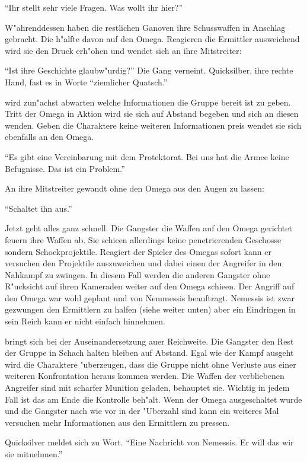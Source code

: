 "`Ihr stellt sehr viele Fragen. Was wollt ihr hier?"'

W"ahrenddessen haben die restlichen Ganoven ihre Schusswaffen in Anschlag gebracht. Die h"alfte davon auf den Omega. Reagieren die Ermittler ausweichend wird sie den Druck erh"ohen und wendet sich an ihre Mitstreiter:

"`Ist ihre Geschichte glaubw"urdig?"' Die Gang verneint. Quicksilber, ihre rechte Hand, fast es in Worte "`ziemlicher Quatsch."'

\xlsn{} wird zun"achst abwarten welche Informationen die Gruppe bereit ist zu geben. Tritt der Omega in Aktion wird sie sich auf Abstand begeben und sich an diesen wenden. Geben die Charaktere keine weiteren Informationen preis wendet sie sich ebenfalls an den Omega.

"`Es gibt eine Vereinbarung mit dem Protektorat. Bei uns hat die Armee keine Befugnisse. Das ist ein Problem."' 

An ihre Mitstreiter gewandt ohne den Omega aus den Augen zu lassen:

"`Schaltet ihn aus."'

Jetzt geht alles ganz schnell. Die Gangster die Waffen auf den Omega gerichtet feuern ihre Waffen ab. Sie schie\3en allerdings keine penetrierenden Geschosse sondern Schockprojektile. Reagiert der Spieler des Omegas sofort kann er versuchen den Projektile auszuweichen und dabei einen der Angreifer in den Nahkampf zu zwingen. In diesem Fall werden die anderen Gangster ohne R"ucksicht auf ihren Kameraden weiter auf den Omega schie\3en. Der Angriff auf den Omega war wohl geplant und von Nemmessis beauftragt. Nemessis ist zwar gezwungen den Ermittlern zu halfen (siehe weiter unten) aber ein Eindringen in sein Reich kann er nicht einfach hinnehmen. 

\xlsn{} bringt sich bei der Auseinandersetzung au\3er Reichweite. Die Gangster den Rest der Gruppe in Schach halten bleiben auf Abstand. Egal wie der Kampf ausgeht wird \xlsn{} die Charaktere "uberzeugen, dass die Gruppe nicht ohne Verluste aus einer weiteren Konfrontation heraus kommen werden. Die Waffen der verbliebenen Angreifer sind mit scharfer Munition geladen, behauptet sie. Wichtig in jedem Fall ist das \xlsn{} am Ende die Kontrolle beh"alt. Wenn der Omega ausgeschaltet wurde und die Gangster nach wie vor in der "Uberzahl sind kann \xlsn{} ein weiteres Mal versuchen mehr Informationen aus den Ermittlern zu pressen.

Quicksilver meldet sich zu Wort. "`Eine Nachricht von Nemessis. Er will das wir sie mitnehmen."'

